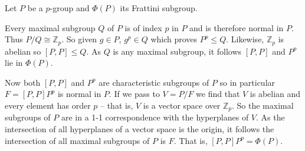 \documentclass[12pt]{article}
\begin{document}
Let $P$ be a $p$-group and $\Phi(P)$ its Frattini subgroup.

Every maximal subgroup $Q$ of $P$ is of index $p$ in $P$ and is therefore
normal in $P$.  Thus $P/Q\cong \mathbb{Z}_p$.  So given 
$g\in P$, $g^p\in Q$
which proves $P^p\leq Q$.  Likewise, $\mathbb{Z}_p$ is abelian so 
$[P,P]\leq Q$.  As $Q$ is any maximal subgroup, it follows $[P,P]$ and
$P^p$ lie in $\Phi(P)$.

Now both $[P,P]$ and $P^p$ are characteristic subgroups of $P$ so in particular
$F =[P,P]P^p$ is normal in $P$.  If we pass to $V=P/F$ we find that $V$ is abelian and every element has order $p$ -- that is, $V$ is a vector space over $\mathbb{Z}_p$.  So the maximal subgroups of $P$ are in a 1-1 correspondence with the hyperplanes of $V$.  As the intersection of all hyperplanes of a vector space is the origin, it follows the intersection of all maximal subgroups of $P$ is $F$.  That is, $[P,P]P^p=\Phi(P)$.

\end{document}
